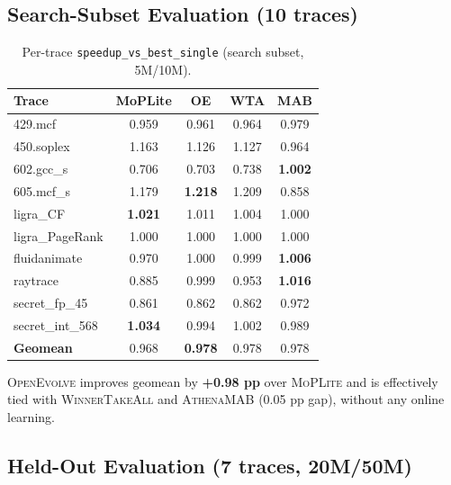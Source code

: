 \documentclass[10pt,twocolumn]{article}
\begin{document}
\subsection{Search-Subset Evaluation (10 traces)}

\begin{table}[h]
\centering
\caption{Per-trace \texttt{speedup\_vs\_best\_single} (search subset, 5M/10M).}
\label{tab:search}
\small
\begin{tabular}{lcccc}
\toprule
\textbf{Trace} & \textbf{MoPLite} & \textbf{OE} & \textbf{WTA} & \textbf{MAB} \\
\midrule
429.mcf          & 0.959 & 0.961 & 0.964 & 0.979 \\
450.soplex        & 1.163 & 1.126 & 1.127 & 0.964 \\
602.gcc\_s        & 0.706 & 0.703 & 0.738 & \textbf{1.002} \\
605.mcf\_s        & 1.179 & \textbf{1.218} & 1.209 & 0.858 \\
ligra\_CF         & \textbf{1.021} & 1.011 & 1.004 & 1.000 \\
ligra\_PageRank   & 1.000 & 1.000 & 1.000 & 1.000 \\
fluidanimate      & 0.970 & 1.000 & 0.999 & \textbf{1.006} \\
raytrace          & 0.885 & 0.999 & 0.953 & \textbf{1.016} \\
secret\_fp\_45    & 0.861 & 0.862 & 0.862 & 0.972 \\
secret\_int\_568  & \textbf{1.034} & 0.994 & 1.002 & 0.989 \\
\midrule
\textbf{Geomean} & 0.968 & \textbf{0.978} & 0.978 & 0.978 \\
\bottomrule
\end{tabular}
\end{table}

\textsc{OpenEvolve} improves geomean by \textbf{+0.98 pp} over \textsc{MoPLite}
and is effectively tied with \textsc{WinnerTakeAll} and \textsc{AthenaMAB}
(0.05 pp gap), without any online learning.

\subsection{Held-Out Evaluation (7 traces, 20M/50M)}
\end{document}
